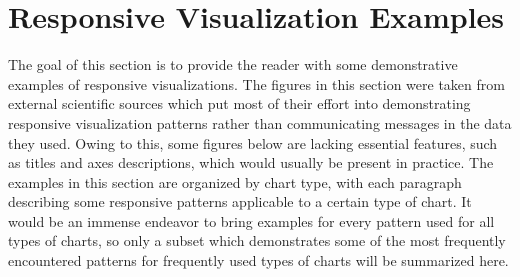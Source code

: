 \section{Responsive Visualization Examples}

The goal of this section is to provide the reader with some
demonstrative examples of responsive visualizations.  The figures in
this section were taken from external scientific sources which put
most of their effort into demonstrating responsive visualization
patterns rather than communicating messages in the data they used.
Owing to this, some figures below are lacking essential features, such
as titles and axes descriptions, which would usually be present in
practice.  The examples in this section are organized by chart type,
with each paragraph describing some responsive patterns applicable to
a certain type of chart.  It would be an immense endeavor to bring
examples for every pattern used for all types of charts, so only a
subset which demonstrates some of the most frequently encountered
patterns for frequently used types of charts will be summarized here.

